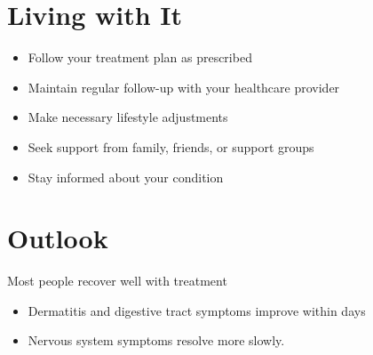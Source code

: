\section{Living with It}
\begin{itemize}[noitemsep]
  \item Follow your treatment plan as prescribed
  \item Maintain regular follow-up with your healthcare provider
  \item Make necessary lifestyle adjustments
  \item Seek support from family, friends, or support groups
  \item Stay informed about your condition
\end{itemize}
\section{Outlook}
Most people recover well with treatment

\begin{itemize}[noitemsep]
  \item Dermatitis and digestive tract symptoms improve within days
  \item Nervous system symptoms resolve more slowly.
\end{itemize}
